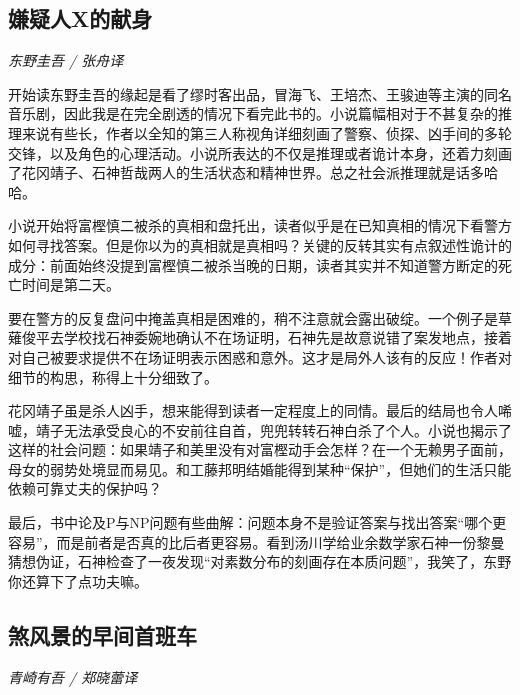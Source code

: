 \subsection*{嫌疑人X的献身}
\par \emph{东野圭吾 / 张舟译}

\par 开始读东野圭吾的缘起是看了缪时客出品，冒海飞、王培杰、王骏迪等主演的同名音乐剧，因此我是在完全剧透的情况下看完此书的。小说篇幅相对于不甚复杂的推理来说有些长，作者以全知的第三人称视角详细刻画了警察、侦探、凶手间的多轮交锋，以及角色的心理活动。小说所表达的不仅是推理或者诡计本身，还着力刻画了花冈靖子、石神哲哉两人的生活状态和精神世界。总之社会派推理就是话多哈哈。
\par 小说开始将富{樫}慎二被杀的真相和盘托出，读者似乎是在已知真相的情况下看警方如何寻找答案。但是你以为的真相就是真相吗？关键的反转其实有点叙述性诡计的成分：前面始终没提到富{樫}慎二被杀当晚的日期，读者其实并不知道警方断定的死亡时间是第二天。
\par 要在警方的反复盘问中掩盖真相是困难的，稍不注意就会露出破绽。一个例子是草{薙}俊平去学校找石神委婉地确认不在场证明，石神先是故意说错了案发地点，接着对自己被要求提供不在场证明表示困惑和意外。这才是局外人该有的反应！作者对细节的构思，称得上十分细致了。
\par 花冈靖子虽是杀人凶手，想来能得到读者一定程度上的同情。最后的结局也令人唏嘘，靖子无法承受良心的不安前往自首，兜兜转转石神白杀了个人。小说也揭示了这样的社会问题：如果靖子和美里没有对富{樫}动手会怎样？在一个无赖男子面前，母女的弱势处境显而易见。和工藤邦明结婚能得到某种“保护”，但她们的生活只能依赖可靠丈夫的保护吗？
\par 最后，书中论及P与NP问题有些曲解：问题本身不是验证答案与找出答案“哪个更容易”，而是前者是否真的比后者更容易。看到汤川学给业余数学家石神一份黎曼猜想伪证，石神检查了一夜发现“对素数分布的刻画存在本质问题”，我笑了，东野你还算下了点功夫嘛。
\par {}



\subsection*{煞风景的早间首班车}
\par \emph{青崎有吾 / 郑晓蕾译} 

